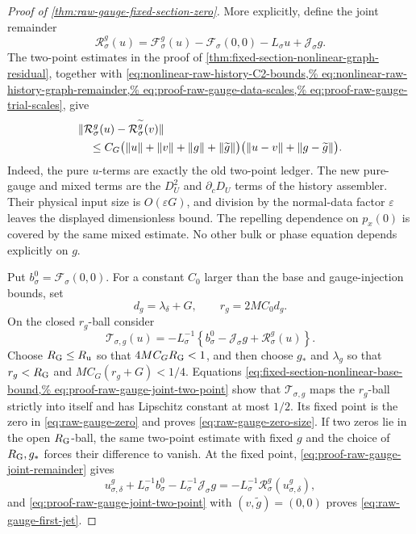 \begin{proof}[Proof of
\cref{thm:raw-gauge-fixed-section-zero}]
More explicitly, define the joint remainder
\begin{equation}
 \mathcal R_{\sigma}^{g}(u)
 =\mathcal F_\sigma^g(u)-\mathcal F_\sigma(0,0)
       -L_\sigma u+\mathscr J_\sigma g.           \label{eq:proof-raw-gauge-joint-remainder}
\end{equation}
The two-point estimates in the proof of
\cref{thm:fixed-section-nonlinear-graph-residual}, together with
\cref{eq:nonlinear-raw-history-C2-bounds,%
eq:nonlinear-raw-history-graph-remainder,%
eq:proof-raw-gauge-data-scales,%
eq:proof-raw-gauge-trial-scales}, give
\begin{align}
 &\|\mathcal R_\sigma^g(u)-
          \mathcal R_\sigma^{\widetilde g}(v)\|\notag\\
 &\quad\le C_G\bigl(\|u\|+\|v\|+
             \|g\|+\|\widetilde g\|\bigr)
       \bigl(\|u-v\|+\|g-\widetilde g\|\bigr) . \label{eq:proof-raw-gauge-joint-two-point}
\end{align}
Indeed, the pure \(u\)-terms are exactly the old two-point ledger.  The
new pure-gauge and mixed terms are the \(D_U^2\) and
\(\partial_cD_U\) terms of the history assembler.  Their physical input
size is \(O(\varepsilon G)\), and division by the normal-data factor
\(\varepsilon\) leaves the displayed dimensionless bound.  The repelling
dependence on \(p_x(0)\) is covered by the same mixed estimate.  No other
bulk or phase equation depends explicitly on \(g\).

Put \(b_\sigma^0=\mathcal F_\sigma(0,0)\).  For a constant \(C_0\) larger
than the base and gauge-injection bounds, set
\begin{equation}
 d_g=\lambda_\delta+G,
 \qquad r_g=2MC_0d_g.                             \label{eq:proof-raw-gauge-radius}
\end{equation}
On the closed \(r_g\)-ball consider
\begin{equation}
 \mathcal T_{\sigma,g}(u)
 =-L_\sigma^{-1}\left\{
    b_\sigma^0-\mathscr J_\sigma g
          +\mathcal R_\sigma^g(u)\right\}.       \label{eq:proof-raw-gauge-contraction}
\end{equation}
Choose
\(R_{\rm G}\le R_{\rm u}\) so that
\(4MC_GR_{\rm G}<1\), and then choose
\(g_*\) and \(\lambda_g\) so that
\(r_g<R_{\rm G}\) and
\(MC_G(r_g+G)<1/4\).
Equations
\cref{eq:fixed-section-nonlinear-base-bound,%
eq:proof-raw-gauge-joint-two-point}
show that \(\mathcal T_{\sigma,g}\) maps the \(r_g\)-ball strictly into
itself and has Lipschitz constant at most \(1/2\).  Its fixed point is the
zero in \cref{eq:raw-gauge-zero} and proves
\cref{eq:raw-gauge-zero-size}.  If two zeros lie in the open
\(R_{\rm G}\)-ball, the same two-point estimate with fixed \(g\) and the
choice of \(R_{\rm G},g_*\) forces their difference to vanish.  At the
fixed point, \cref{eq:proof-raw-gauge-joint-remainder} gives
\begin{equation*}
 u_{\sigma,\delta}^g+L_\sigma^{-1}b_\sigma^0
       -L_\sigma^{-1}\mathscr J_\sigma g
 =-L_\sigma^{-1}\mathcal R_\sigma^g
       (u_{\sigma,\delta}^g),
\end{equation*}
and \cref{eq:proof-raw-gauge-joint-two-point} with
\((v,\widetilde g)=(0,0)\) proves
\cref{eq:raw-gauge-first-jet}.


\end{proof}
